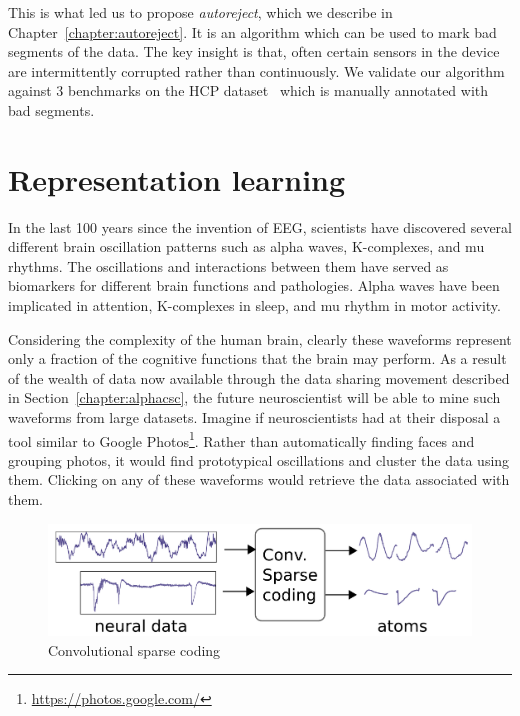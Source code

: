 This is what led us to propose \emph{autoreject}, which we describe in Chapter~\ref{chapter:autoreject}. It is an algorithm which can be used to mark bad segments of the data. The key insight is that, often certain sensors in the device are intermittently corrupted rather than continuously. We validate our algorithm against 3 benchmarks on the HCP dataset~\citep{larson2013adding} which is manually annotated with bad segments.

%

\clearpage
\section{Representation learning}
In the last 100 years since the invention of EEG, scientists have discovered several different brain oscillation patterns such as alpha waves, K-complexes, and mu rhythms. The oscillations and interactions between them have served as biomarkers for different brain functions and pathologies. Alpha waves have been implicated in attention, K-complexes in sleep, and mu rhythm in motor activity. 

Considering the complexity of the human brain, clearly these waveforms represent only a fraction of the cognitive functions that the brain may perform. As a result of the wealth of data now available through the data sharing movement described in Section~\ref{chapter:alphacsc}, the future neuroscientist will be able to mine such waveforms from large datasets. Imagine if neuroscientists had at their disposal a tool similar to Google Photos\footnote{\url{https://photos.google.com/}}. Rather than automatically finding faces and grouping photos, it would find prototypical oscillations and cluster the data using them. Clicking on any of these waveforms would retrieve the data associated with them.

\begin{figure}[htb]
\begin{center}
   \includegraphics[width=0.7\linewidth]{figures/schema.pdf}
\end{center}
   \caption[Convolutional sparse coding]{Convolutional sparse coding}
   \label{fig:neuroimaging_methods}
\end{figure}

